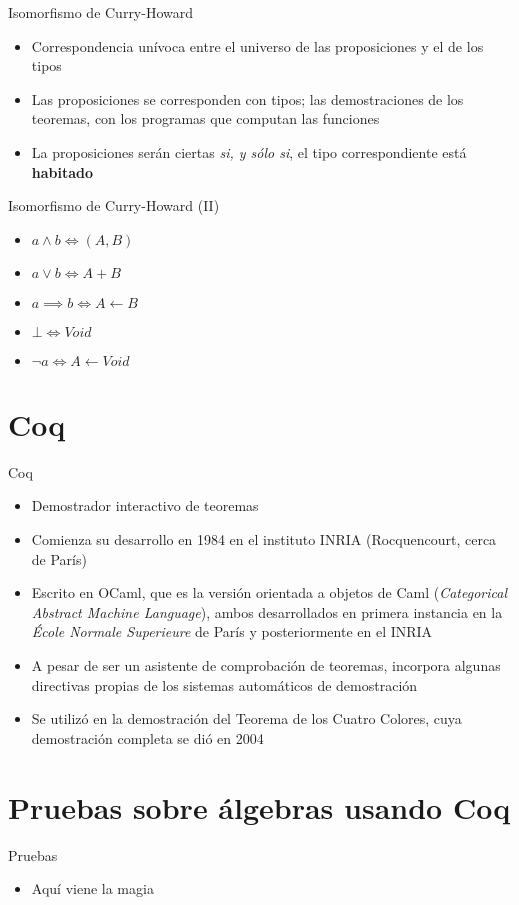 \documentclass[10pt]{beamer}
\begin{document}
\begin{frame}[fragile]{Isomorfismo de Curry-Howard}

  \begin{itemize}
  \item Correspondencia unívoca entre el universo de las proposiciones
    y el de los tipos
  \item Las proposiciones se corresponden con tipos; las
    demostraciones de los teoremas, con los programas que computan las
    funciones
  \item La proposiciones serán ciertas \textit{si, y sólo si}, el tipo
    correspondiente está \textbf{habitado}
  \end{itemize}

\end{frame}

\begin{frame}[fragile]{Isomorfismo de Curry-Howard (II)}

  \begin{itemize}
  \item $a \land b \iff (A, B)$
  \item $a \lor b \iff A + B$
  \item $a \implies b \iff A \leftarrow B$
  \item $\bot \iff Void$
  \item $\neg a \iff A \leftarrow Void$
  \end{itemize}

\end{frame}

\section{Coq}

\begin{frame}[fragile]{Coq}

  \begin{itemize}
  \item Demostrador interactivo de teoremas
  \item Comienza su desarrollo en 1984 en el instituto INRIA
    (Rocquencourt, cerca de París)
  \item Escrito en OCaml, que es la versión orientada a objetos de
    Caml (\textit{Categorical Abstract Machine Language}), ambos
    desarrollados en primera instancia en la \textit{École Normale
      Superieure} de París y posteriormente en el INRIA
  \item A pesar de ser un asistente de comprobación de teoremas,
    incorpora algunas directivas propias de los sistemas automáticos
    de demostración
  \item Se utilizó en la demostración del Teorema de los Cuatro Colores,
    cuya demostración completa se dió en 2004
  \end{itemize}

\end{frame}

\section{Pruebas sobre álgebras usando Coq}

\begin{frame}[fragile]{Pruebas}

  \begin{itemize}
  \item Aquí viene la magia
  \end{itemize}

\end{frame}
\end{document}
